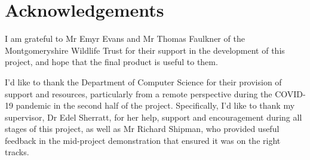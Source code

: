 \thispagestyle{empty}


\section*{\centering Acknowledgements}


I am grateful to Mr Emyr Evans and Mr Thomas Faulkner of the Montgomeryshire Wildlife Trust for their support in the development of this project, and hope that the final product is useful to them.

I'd like to thank the Department of Computer Science for their provision of support and resources, particularly from a remote perspective during the COVID-19 pandemic in the second half of the project. Specifically, I'd like to thank my supervisor, Dr Edel Sherratt, for her help, support and encouragement during all stages of this project, as well as Mr Richard Shipman, who provided useful feedback in the mid-project demonstration that ensured it was on the right tracks.

